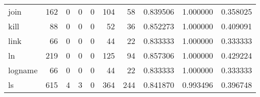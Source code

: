 \begin{longtable}{lrrrrrrrrr}
join      &                                   162 &                                                  0 &                                                  0 &                                                  0 &                                                104 &                                                 58 &                                           0.839506 &                               1.000000 &                             0.358025 \\
kill      &                                    88 &                                                  0 &                                                  0 &                                                  0 &                                                 52 &                                                 36 &                                           0.852273 &                               1.000000 &                             0.409091 \\
link      &                                    66 &                                                  0 &                                                  0 &                                                  0 &                                                 44 &                                                 22 &                                           0.833333 &                               1.000000 &                             0.333333 \\
ln        &                                   219 &                                                  0 &                                                  0 &                                                  0 &                                                125 &                                                 94 &                                           0.857306 &                               1.000000 &                             0.429224 \\
logname   &                                    66 &                                                  0 &                                                  0 &                                                  0 &                                                 44 &                                                 22 &                                           0.833333 &                               1.000000 &                             0.333333 \\
ls        &                                   615 &                                                  4 &                                                  3 &                                                  0 &                                                364 &                                                244 &                                           0.841870 &                               0.993496 &                             0.396748 \\

\end{longtable}

